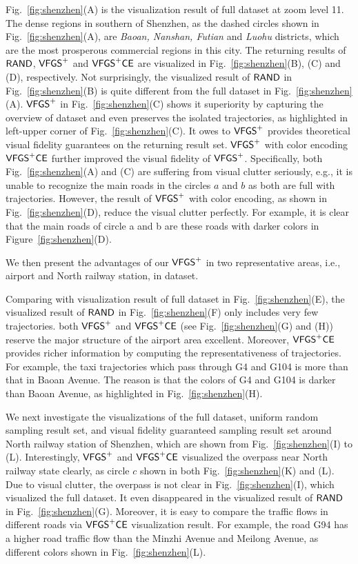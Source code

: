 {
Fig.~\ref{fig:shenzhen}(A) is the visualization result of full \sz{} dataset at zoom level 11.
The dense regions in southern of Shenzhen, as the dashed circles shown in Fig.~\ref{fig:shenzhen}(A), are \emph{Baoan, Nanshan, Futian} and \emph{Luohu} districts,
which are the most prosperous commercial regions in this city.
The returning results of $\mathsf{RAND}$, $\mathsf{VFGS}^{+}$ and $\mathsf{VFGS}^{+}\mathsf{CE}$ are visualized in Fig.~\ref{fig:shenzhen}(B), (C) and (D), respectively.
Not surprisingly,  the visualized result of $\mathsf{RAND}$ in Fig.~\ref{fig:shenzhen}(B) is quite different from the full dataset in Fig.~\ref{fig:shenzhen}(A).
$\mathsf{VFGS}^{+}$ in Fig.~\ref{fig:shenzhen}(C) shows it superiority by capturing the overview of \sz{} dataset and even preserves the isolated trajectories,
as highlighted in left-upper corner of Fig.~\ref{fig:shenzhen}(C).
It owes to $\mathsf{VFGS}^{+}$ provides theoretical visual fidelity guarantees on the returning result set.
$\mathsf{VFGS}^{+}$ with color encoding $\mathsf{VFGS}^{+}\mathsf{CE}$ further improved the visual fidelity of $\mathsf{VFGS}^{+}$.
Specifically, both Fig.~\ref{fig:shenzhen}(A) and (C) are suffering from visual clutter seriously,
e.g., it is unable to recognize the main roads in the circles $a$ and $b$ as both are full with trajectories.
However, the result of $\mathsf{VFGS}^{+}$ with color encoding, as shown in Fig.~\ref{fig:shenzhen}(D), reduce the visual clutter perfectly.
For example, it is clear that the main roads of circle a and b are these roads with {darker} colors in Figure~\ref{fig:shenzhen}(D).

We then present the advantages of our $\mathsf{VFGS}^{+}$ in two representative areas, i.e., airport and North railway station, in \sz{} dataset.

Comparing with visualization result of full dataset in Fig.~\ref{fig:shenzhen}(E),
the visualized result of $\mathsf{RAND}$ in Fig.~\ref{fig:shenzhen}(F) only includes very few trajectories.
both $\mathsf{VFGS}^{+}$ and $\mathsf{VFGS}^{+}\mathsf{CE}$ (see Fig.~\ref{fig:shenzhen}(G) and (H)) reserve the major structure of the airport area excellent.
Moreover, $\mathsf{VFGS}^{+}\mathsf{CE}$ provides richer information by computing the representativeness of trajectories.
For example, the taxi trajectories which pass through G4 and G104 is more than that in Baoan Avenue.
The reason is that the colors of G4 and G104 is {darker} than Baoan Avenue, as highlighted in Fig.~\ref{fig:shenzhen}(H).


We next investigate the visualizations of the full dataset, uniform random sampling result set, and visual fidelity guaranteed sampling result set around North railway station of Shenzhen, which are shown from Fig.~\ref{fig:shenzhen}(I) to (L).
Interestingly, $\mathsf{VFGS}^{+}$ and $\mathsf{VFGS}^{+}\mathsf{CE}$ visualized the overpass near North railway state clearly, as circle $c$ shown in both Fig.~\ref{fig:shenzhen}(K) and (L).
Due to visual clutter, the overpass is not clear in Fig.~\ref{fig:shenzhen}(I), which visualized the full dataset.
It even disappeared in the visualized result of $\mathsf{RAND}$ in Fig.~\ref{fig:shenzhen}(G).
Moreover, it is easy to compare the traffic flows in different roads via $\mathsf{VFGS}^{+}\mathsf{CE}$ visualization result.
For example, the road G94 has a higher road traffic flow than the Minzhi Avenue and Meilong Avenue, as different colors shown in Fig.~\ref{fig:shenzhen}(L).
}




